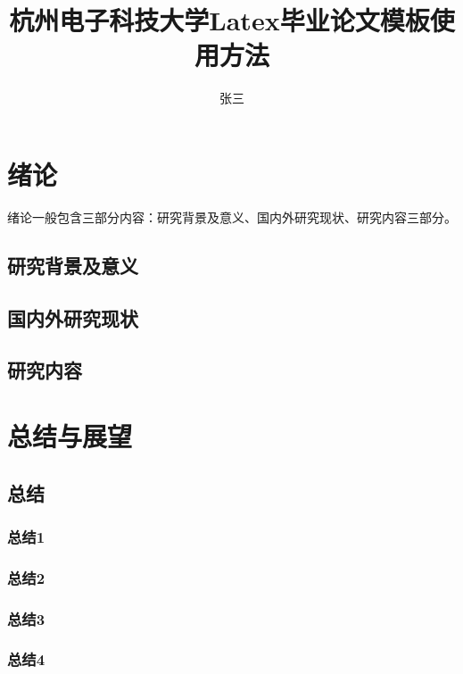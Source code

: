 \documentclass[master,draft]{styles/hdu-thesis}
\title{杭州电子科技大学Latex毕业论文模板使用方法}{Munual of latex on thesis for HDU}
\author{张三}{San Zhang}%
\begin{document}
\makecover
\makedeclaration


% 
% 



\ifdraft{
  \listoftodos
}{}
\figurelist

\tablelist


\tableofcontents

\chapter{绪论}
  绪论一般包含三部分内容：研究背景及意义、国内外研究现状、研究内容三部分。
  \section{研究背景及意义}
  \section{国内外研究现状}
  \section{研究内容}

\ifdraft{
  
}{}

\chapter{总结与展望}
  \section{总结}
    \subsection{总结1}
    \subsection{总结2}
    \subsection{总结3}
    \subsection{总结4}
\end{document}
